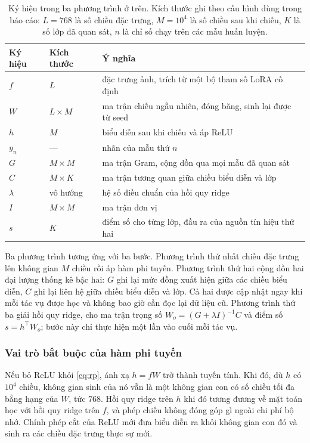 \documentclass[11pt,a4paper]{article}
\begin{document}
\begin{table}[H]
\centering
\caption{Ký hiệu trong ba phương trình ở trên. Kích thước ghi theo cấu hình dùng
trong báo cáo: $L = 768$ là số chiều đặc trưng, $M = 10^4$ là số chiều sau khi
chiếu, $K$ là số lớp đã quan sát, $n$ là chỉ số chạy trên các mẫu huấn luyện.}
\label{tab:notation}
\begin{tabular}{@{}llp{7.4cm}@{}}
\toprule
Ký hiệu & Kích thước & Ý nghĩa \\
\midrule
$f$        & $L$          & đặc trưng ảnh, trích từ một bộ tham số LoRA cố định \\
$W$        & $L \times M$ & ma trận chiếu ngẫu nhiên, đóng băng, sinh lại được từ seed \\
$h$        & $M$          & biểu diễn sau khi chiếu và áp ReLU \\
$y_n$      & ---          & nhãn của mẫu thứ $n$ \\
$G$        & $M \times M$ & ma trận Gram, cộng dồn qua mọi mẫu đã quan sát \\
$C$        & $M \times K$ & ma trận tương quan giữa chiều biểu diễn và lớp \\
$\lambda$  & vô hướng     & hệ số điều chuẩn của hồi quy ridge \\
$I$        & $M \times M$ & ma trận đơn vị \\
$s$        & $K$          & điểm số cho từng lớp, đầu ra của nguồn tín hiệu thứ hai \\
\bottomrule
\end{tabular}
\end{table}

Ba phương trình tương ứng với ba bước. Phương trình thứ nhất chiếu đặc trưng lên
không gian $M$ chiều rồi áp hàm phi tuyến. Phương trình thứ hai cộng dồn hai đại
lượng thống kê bậc hai: $G$ ghi lại mức đồng xuất hiện giữa các chiều biểu diễn,
$C$ ghi lại liên hệ giữa chiều biểu diễn và lớp. Cả hai được cập nhật ngay khi
mỗi tác vụ được học và không bao giờ cần đọc lại dữ liệu cũ. Phương trình thứ ba
giải hồi quy ridge, cho ma trận trọng số $W_o = (G + \lambda I)^{-1} C$ và điểm
số $s = h^{\top} W_o$; bước này chỉ thực hiện một lần vào cuối mỗi tác vụ.

\subsubsection{Vai trò bắt buộc của hàm phi tuyến}

Nếu bỏ ReLU khỏi \eqref{eq:rp}, ánh xạ $h = fW$ trở thành tuyến tính. Khi đó, dù
$h$ có $10^4$ chiều, không gian sinh của nó vẫn là một không gian con có số chiều
tối đa bằng hạng của $W$, tức $768$. Hồi quy ridge trên $h$ khi đó tương đương về
mặt toán học với hồi quy ridge trên $f$, và phép chiếu không đóng góp gì ngoài
chi phí bộ nhớ. Chính phép cắt của ReLU mới đưa biểu diễn ra khỏi không gian con
đó và sinh ra các chiều đặc trưng thực sự mới.
\end{document}
